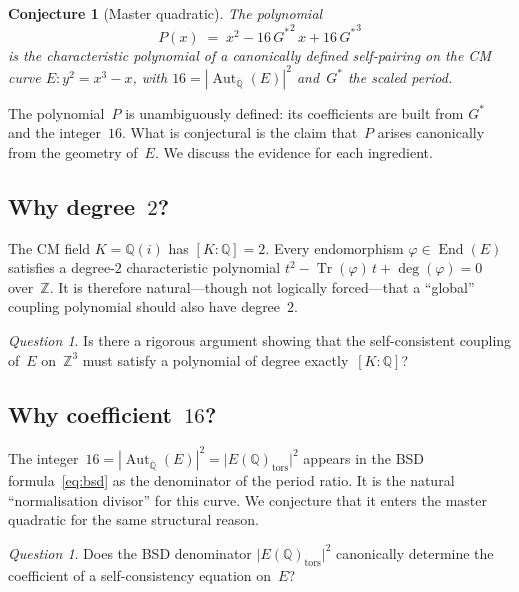 \documentclass[12pt,reqno]{amsart}
\newtheorem{conjecture}[theorem]{Conjecture}
\theoremstyle{definition}
\theoremstyle{remark}
\newtheorem{question}[theorem]{Question}
\newcommand{\ZZ}{\mathbb{Z}}
\newcommand{\QQ}{\mathbb{Q}}
\newcommand{\Qbar}{\overline{\QQ}}
\newcommand{\Gstar}{G^{\!*}}
\newcommand{\Aut}{\operatorname{Aut}}
\newcommand{\End}{\operatorname{End}}
\newcommand{\Tr}{\operatorname{Tr}}
\newcommand{\abs}[1]{\lvert #1 \rvert}
\begin{document}
\begin{conjecture}[Master quadratic]\label{conj:master}
The polynomial
\begin{equation}\label{eq:master-quad}
  P(x) \;=\; x^{2} - 16\,{{\Gstar}}^{2}\,x + 16\,{{\Gstar}}^{3}
\end{equation}
is the characteristic polynomial of a canonically defined self-pairing on the
CM curve $E\colon y^{2}=x^{3}-x$, with $16={|\Aut_{\Qbar}(E)|}^{2}$
and~$\Gstar$ the scaled period.
\end{conjecture}

The polynomial~$P$ is unambiguously defined: its coefficients are built from
$\Gstar$ and the integer~$16$.  What is conjectural is the claim that~$P$
arises canonically from the geometry of~$E$.  We discuss the evidence for each
ingredient.

\subsection{Why degree~\texorpdfstring{$2$}{2}?}\label{ssec:degree}

The CM field $K=\QQ(i)$ has $[K:\QQ]=2$.  Every endomorphism $\varphi\in\End(E)$
satisfies a degree-$2$ characteristic polynomial $t^{2}-\Tr(\varphi)\,t+\deg(\varphi)=0$
over~$\ZZ$.  It is therefore natural---though not logically forced---that a
``global'' coupling polynomial should also have degree~$2$.

\begin{question}\label{q:degree}
Is there a rigorous argument showing that the self-consistent coupling of~$E$
on~$\ZZ^{3}$ must satisfy a polynomial of degree exactly~$[K:\QQ]$?
\end{question}

\subsection{Why coefficient~\texorpdfstring{$16$}{16}?}\label{ssec:coeff}

The integer~$16 = {|\Aut_{\Qbar}(E)|}^{2} = \abs{E(\QQ)_{\mathrm{tors}}}^{2}$
appears in the BSD formula~\eqref{eq:bsd} as the denominator of the period ratio.
It is the natural ``normalisation divisor'' for this curve.  We conjecture that
it enters the master quadratic for the same structural reason.

\begin{question}\label{q:coeff}
Does the BSD denominator $\abs{E(\QQ)_{\mathrm{tors}}}^{2}$ canonically
determine the coefficient of a self-consistency equation on~$E$?
\end{question}
\end{document}

